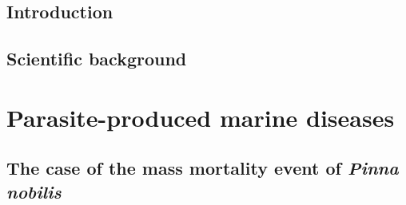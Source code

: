\documentclass[
	10pt, %
	a4paper, %
]{LegrandOrangeBook}
\begin{document}

\chapterspaceabove{6.75cm}
\chapterspacebelow{7.25cm}

\chapter{Introduction}


\chapterspaceabove{6.75cm}
\chapterspacebelow{7.25cm}

\chapter{Scientific background}


{
	\hypersetup{hidelinks}
	\part{Parasite-produced marine diseases}
}
%

\chapterspaceabove{7.75cm}
\chapterspacebelow{7.25cm}

\chapter{The case of the mass mortality event of \textit{Pinna nobilis}}
%
\end{document}
